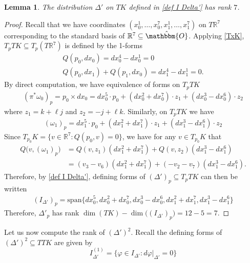 \documentclass[11pt,letterpaper]{amsart}
\newtheorem{lemma}[theorem]{Lemma}
\numberwithin{equation}{section}
\newcommand{\oct}{\hat{\mathbbm{O}}}
\begin{document}
\begin{lemma}
    \label{lemma: Delta' rank}
    The distribution $\Delta'$ on $TK$ defined in \eqref{def I Delta'} has rank $7$.
\end{lemma}
\begin{proof}
    Recall that we have coordinates $(x_0^1,\ldots, x_0^7,x_1^1,\ldots, x_1^7)$ on $T\mathbb{R}^7$ corresponding to the standard basis of $\mathbb{R}^7\subseteq \oct$. Applying \eqref{TxK}, $T_pTK\subseteq T_p(T\mathbb{R}^7)$ is defined by the 1-forms
    \begin{gather}
        Q(p_0,dx_0) = dx_0^4-dx_0^1 = 0
        \\
        Q(p_0, dx_1) + Q(p_1, dx_0) = dx_1^4-dx_1^1 = 0.
    \end{gather}
    By direct computation, we have equivalence of forms on $T_pTK$
    \begin{gather}
        (\pi^*\omega_0)_{p} = p_0\times dx_0 = dx_0^5\cdot p_0 + (dx_0^2+dx_0^7)\cdot z_1 + (dx_0^3-dx_0^6)\cdot z_2
    \end{gather}
    where $z_1 = k +\ell j$ and $z_2 = -j+\ell k$. Similarly, on $T_pTK$ we have
    \begin{gather}
        \label{omega_1_p}
        (\omega_1)_p = dx_1^5\cdot p_0 + (dx_1^2+dx_1^7)\cdot z_1 + (dx_1^3-dx_1^6)\cdot z_2
    \end{gather}
    Since $T_{p_0}K=\{v\in \mathbb R^7: Q(p_0,v)=0\}$, we have for any $v\in T_{p_0}K$ that 
    \begin{align}
        Q\big(v,(\omega_1)_p\big) 
        & = Q(v, z_1)(dx_1^2+dx_1^7) + Q(v,z_2) (dx_1^3-dx_1^6)
        \\ & = (v_3-v_6)(dx_1^2+dx_1^7) + (-v_2-v_7)(dx_1^3-dx_1^6).
    \end{align}
    Therefore, by \eqref{def I Delta'}, defining forms of $(\Delta')_p\subseteq T_pTK$ can then be written
    \begin{gather}
        (I_{\Delta'})_p = \mathrm{span}\{dx_0^5,dx_0^2+dx_0^7,dx_0^3-dx_0^6,dx_1^2+dx_1^7,dx_1^3-dx_1^6\}
    \end{gather}
    Therefore, $\Delta'_p$ has rank $\dim(TK)-\dim\big((I_{\Delta'})_p\big)=12-5=7$.
\end{proof}

Let us now compute the rank of $(\Delta')^2$. Recall the defining forms of $(\Delta')^2\subseteq TTK$ are given by
\begin{equation}
    I_{\Delta'}^{(1)} = \{\varphi\in I_{\Delta'}: d\varphi|_{\Delta'}=0\}
\end{equation}
\end{document}
